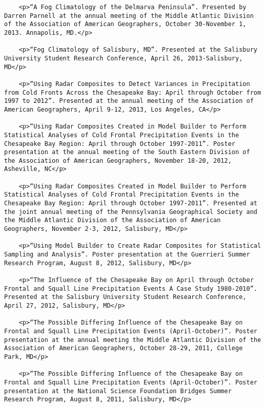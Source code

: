 \documentclass[
]{article}
\begin{document}
\begin{verbatim}
    <p>“A Fog Climatology of the Delmarva Peninsula”. Presented by Darren Parnell at the annual meeting of the Middle Atlantic Division of the Association of American Geographers, October 30-November 1, 2013. Annapolis, MD.</p>
    
    <p>“Fog Climatology of Salisbury, MD”. Presented at the Salisbury University Student Research Conference, April 26, 2013-Salisbury, MD</p>
     
    <p>“Using Radar Composites to Detect Variances in Precipitation from Cold Fronts Across the Chesapeake Bay: April through October from 1997 to 2012”. Presented at the annual meeting of the Association of American Geographers, April 9-12, 2013, Los Angeles, CA</p>
    
    <p>“Using Radar Composites Created in Model Builder to Perform Statistical Analyses of Cold Frontal Precipitation Events in the Chesapeake Bay Region: April through October 1997-2011”. Poster presentation at the annual meeting of the South Eastern Division of the Association of American Geographers, November 18-20, 2012, Asheville, NC</p>
    
    <p>“Using Radar Composites Created in Model Builder to Perform Statistical Analyses of Cold Frontal Precipitation Events in the Chesapeake Bay Region: April through October 1997-2011”. Presented at the joint annual meeting of the Pennsylvania Geographical Society and the Middle Atlantic Division of the Association of American Geographers, November 2-3, 2012, Salisbury, MD</p>
    
    <p>“Using Model Builder to Create Radar Composites for Statistical Sampling and Analysis”. Poster presentation at the Guerrieri Summer Research Program, August 8, 2012, Salisbury, MD</p>
    
    <p>“The Influence of the Chesapeake Bay on April through October Frontal and Squall Line Precipitation Events A Case Study 1980-2010”. Presented at the Salisbury University Student Research Conference, April 27, 2012, Salisbury, MD</p>
    
    <p>“The Possible Differing Influence of the Chesapeake Bay on Frontal and Squall Line Precipitation Events (April-October)”. Poster presentation at the annual meeting the Middle Atlantic Division of the Association of American Geographers, October 28-29, 2011, College Park, MD</p>
    
    <p>“The Possible Differing Influence of the Chesapeake Bay on Frontal and Squall Line Precipitation Events (April-October)”. Poster presentation at the National Science Foundation Bridges Summer Research Program, August 8, 2011, Salisbury, MD</p>
    

\end{verbatim}
\end{document}
